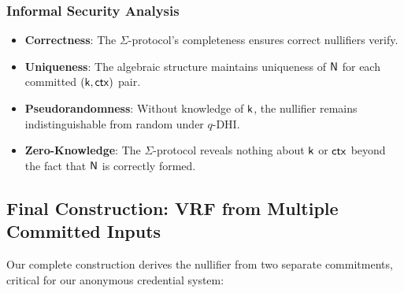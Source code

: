 

































\subsubsection{Informal Security Analysis}
\begin{itemize}
    \item \textbf{Correctness}: The $\Sigma$-protocol's completeness ensures correct nullifiers verify.
    \item \textbf{Uniqueness}: The algebraic structure maintains uniqueness of $\mathsf{N}$ for each committed $(\mathsf{k},\mathsf{ctx})$ pair.
    \item \textbf{Pseudorandomness}: Without knowledge of $\mathsf{k}$, the nullifier remains indistinguishable from random under $q$-DHI.
    \item \textbf{Zero-Knowledge}: The $\Sigma$-protocol reveals nothing about $\mathsf{k}$ or $\mathsf{ctx}$ beyond the fact that $\mathsf{N}$ is correctly formed.
\end{itemize}

\subsection{Final Construction: VRF from Multiple Committed Inputs}
Our complete construction derives the nullifier from two separate commitments, critical for our anonymous credential system:

